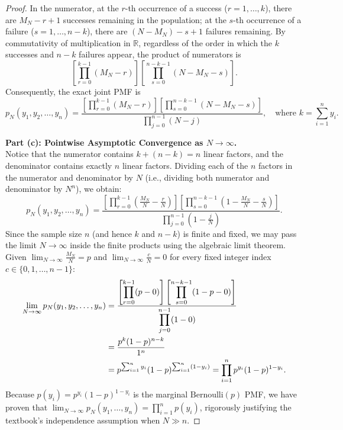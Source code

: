 \documentclass[11pt, letterpaper]{article}
\theoremstyle{definition}
\theoremstyle{remark}
\newcommand{\R}{\mathbb{R}}
\begin{document}
\begin{proof}
In the numerator, at the $r$-th occurrence of a success ($r = 1, \dots, k$), there are $M_N - r + 1$ successes remaining in the population; at the $s$-th occurrence of a failure ($s = 1, \dots, n - k$), there are $(N - M_N) - s + 1$ failures remaining. By commutativity of multiplication in $\R$, regardless of the order in which the $k$ successes and $n-k$ failures appear, the product of numerators is
\[
    \left[ \prod_{r=0}^{k-1} (M_N - r) \right] \left[ \prod_{s=0}^{n-k-1} (N - M_N - s) \right].
\]
Consequently, the exact joint PMF is
\[
    p_N(y_1, y_2, \dots, y_n) = \frac{\displaystyle \left[ \prod_{r=0}^{k-1} (M_N - r) \right] \left[ \prod_{s=0}^{n-k-1} (N - M_N - s) \right]}{\displaystyle \prod_{j=0}^{n-1} (N - j)}, \quad \text{where } k = \sum_{i=1}^{n} y_i.
\]

\textbf{Part (c): Pointwise Asymptotic Convergence as $N \to \infty$.} \\ \relax
Notice that the numerator contains $k + (n - k) = n$ linear factors, and the denominator contains exactly $n$ linear factors. Dividing each of the $n$ factors in the numerator and denominator by $N$ (i.e., dividing both numerator and denominator by $N^n$), we obtain:
\[
    p_N(y_1, y_2, \dots, y_n) = \frac{\displaystyle \left[ \prod_{r=0}^{k-1} \left(\frac{M_N}{N} - \frac{r}{N}\right) \right] \left[ \prod_{s=0}^{n-k-1} \left(1 - \frac{M_N}{N} - \frac{s}{N}\right) \right]}{\displaystyle \prod_{j=0}^{n-1} \left(1 - \frac{j}{N}\right)}.
\]
Since the sample size $n$ (and hence $k$ and $n-k$) is finite and fixed, we may pass the limit $N \to \infty$ inside the finite products using the algebraic limit theorem. Given $\lim_{N \to \infty} \frac{M_N}{N} = p$ and $\lim_{N \to \infty} \frac{c}{N} = 0$ for every fixed integer index $c \in \{0, 1, \dots, n-1\}$:
\begin{align*}
    \lim_{N \to \infty} p_N(y_1, y_2, \dots, y_n) 
    &= \frac{\displaystyle \left[ \prod_{r=0}^{k-1} (p - 0) \right] \left[ \prod_{s=0}^{n-k-1} (1 - p - 0) \right]}{\displaystyle \prod_{j=0}^{n-1} (1 - 0)} \\ \relax
    &= \frac{p^k (1 - p)^{n - k}}{1^n} \\ \relax
    &= p^{\sum_{i=1}^n y_i} (1 - p)^{\sum_{i=1}^n (1 - y_i)} = \prod_{i=1}^{n} p^{y_i} (1 - p)^{1 - y_i}.
\end{align*}
Because $p(y_i) = p^{y_i}(1 - p)^{1 - y_i}$ is the marginal $\text{Bernoulli}(p)$ PMF, we have proven that $\lim_{N \to \infty} p_N(y_1, \dots, y_n) = \prod_{i=1}^n p(y_i)$, rigorously justifying the textbook's independence assumption when $N \gg n$.
\end{proof}
\end{document}

